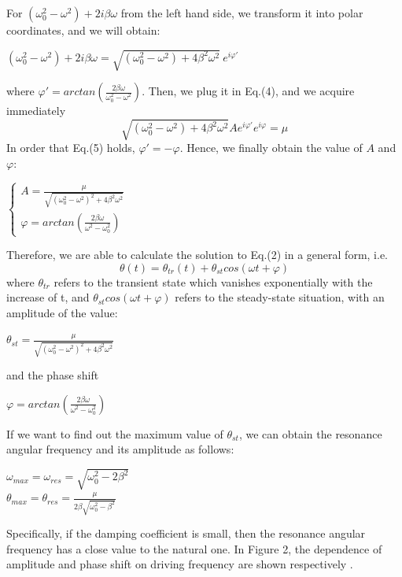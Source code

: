 \documentclass[a4paper,12pt]{article}
\begin{document}
For $(\omega_0^2-\omega^2) + 2i\beta \omega$ from the left hand side, we transform it into polar coordinates, and we will obtain:
\begin{center}
 $(\omega_0^2-\omega^2) + 2i\beta \omega = \sqrt{(\omega_0^2 - \omega^2) + 4\beta^2\omega^2}~e^{i\varphi'}$
\end{center}
where $\varphi' = arctan(\frac{2\beta \omega}{\omega_0^2-\omega^2})$. Then, we plug it in Eq.(4), and we acquire immediately 
\begin{equation}
\sqrt{(\omega_0^2 - \omega^2) + 4\beta^2\omega^2} A e^{i\varphi'} e^{i\varphi}= \mu
\end{equation}
In order that Eq.(5) holds, $\varphi' = - \varphi$. Hence, we finally obtain the value of $A$ and $\varphi$:
\begin{center}
$\left\{
\begin{aligned}
A = \frac{\mu}{\sqrt{(\omega_0^2 - \omega^2)^2 + 4\beta^2\omega^2}}
\\
\varphi = arctan(\frac{2\beta \omega}{\omega^2-\omega_0^2})~~~~~~~~
\end{aligned}
\right.$
\end{center}
\newpage
Therefore, we are able to calculate the solution to Eq.(2) in a general form, i.e.
\begin{equation}
\theta(t) = \theta_{tr}(t) + \theta_{st}cos(\omega t + \varphi)
\end{equation}
where $\theta_{tr}$ refers to the transient state which vanishes exponentially with the increase of t, and $\theta_{st}cos(\omega t + \varphi)$ refers to the steady-state situation, with an amplitude of the value:
\begin{center}
$\displaystyle \theta_{st} = \frac{\mu}{\sqrt{(\omega_0^2 - \omega^2)^2 + 4\beta^2\omega^2}} $
\end{center}
and the phase shift 
\begin{center}
$\displaystyle \varphi = arctan(\frac{2\beta \omega}{\omega^2-\omega_0^2})$
\end{center}
\par If we want to find out the maximum value of $\theta_{st}$, we can obtain the resonance angular frequency and its amplitude as follows:
\begin{center}
$\displaystyle \omega_{max} = \omega_{res} = \sqrt{\omega_0^2 - 2\beta^2}$\\[3 mm]
$\displaystyle \theta_{max} = \theta_{res} = \frac{\mu}{2\beta \sqrt{\omega_0^2 - \beta^2}}$
\end{center}
\par Specifically, if the damping coefficient is small, then the resonance angular frequency has a close value to the natural one. In Figure 2, the dependence of amplitude and phase shift on driving frequency are shown respectively \cite{labmanual}.
\end{document}
